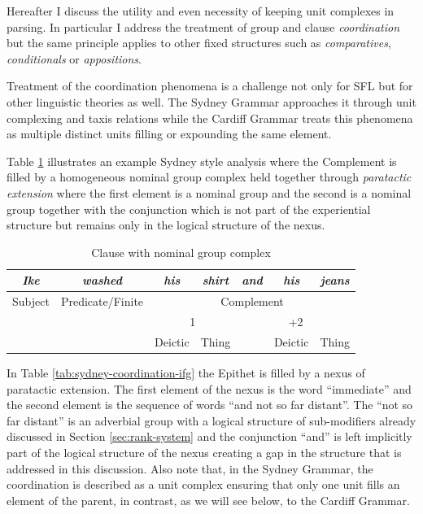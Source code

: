     Hereafter I discuss the utility and even necessity of keeping unit complexes in parsing. In particular I address the treatment of group and clause \textit{coordination} but the same principle applies to other fixed structures such as \textit{comparatives}, \textit{conditionals} or \textit{appositions}.
    
    Treatment of the coordination phenomena is a challenge not only for SFL but for other linguistic theories as well. The Sydney Grammar approaches it through unit complexing and taxis relations while the Cardiff Grammar treats this phenomena as multiple distinct units filling or expounding the same element. 
    
    
    Table \ref{ex:Sydeny-example-analisys} illustrates an example Sydney style analysis where the Complement is filled by a homogeneous nominal group complex held together through \textit{paratactic extension} where the first element is a nominal group and the second is a nominal group together with the conjunction which is not part of the experiential structure but remains only in the logical structure of the nexus. 
    
    \begin{table}[!ht]
        \centering
        \begin{tabular}{cc|c|c|c|c|c|}
            \hline
            \multicolumn{1}{|c|}{\textit{Ike}} & \textit{washed} & \textit{his} & \textit{shirt} & \textit{and} & \textit{his} & \textit{jeans} \\ \hline
            \multicolumn{1}{|c|}{Subject} & Predicate/Finite & \multicolumn{5}{c|}{Complement} \\ \hline
            &  & \multicolumn{2}{c|}{1} & \multicolumn{3}{c|}{+2} \\ \cline{3-7} 
            &  & Deictic & Thing &  & Deictic & Thing \\ \cline{3-4} \cline{6-7} 
        \end{tabular}
        \caption{Clause with nominal group complex}
        \label{ex:Sydeny-example-analisys}
    \end{table}
    
    In Table \ref{tab:sydney-coordination-ifg} the Epithet is filled by a nexus of paratactic extension. The first element of the nexus is the word ``immediate'' and the second element is the sequence of words ``and not so far distant''. The ``not so far distant'' is an adverbial group with a logical structure of sub-modifiers already discussed in Section \ref{sec:rank-system} and the conjunction ``and'' is left implicitly part of the logical structure of the nexus creating a gap in the structure that is addressed in this discussion. Also note that, in the Sydney Grammar, the coordination is described as a unit complex ensuring that only one unit fills an element of the parent, in contrast, as we will see below, to the Cardiff Grammar. 
    
